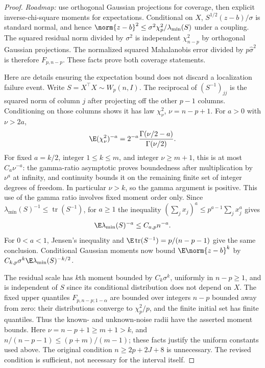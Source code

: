\begin{proof}
\emph{Roadmap:} use orthogonal Gaussian projections for coverage, then explicit inverse-chi-square moments for expectations. Conditional on $X$, $S^{1/2}(z-b)/\sigma$ is standard normal, and hence $\norm{z-b}^2\le\sigma^2\chi_p^2/\lambda_{\min}(S)$ under a coupling. The squared residual norm divided by $\sigma^2$ is independent $\chi^2_{n-p}$ by orthogonal Gaussian projections. The normalized squared Mahalanobis error divided by $p\widehat\sigma^2$ is therefore $F_{p,n-p}$. These facts prove both coverage statements.

Here are details ensuring the expectation bound does not discard a localization failure event. Write $S=X^\top X\sim W_p(n,I)$. The reciprocal of $(S^{-1})_{jj}$ is the squared norm of column $j$ after projecting off the other $p-1$ columns. Conditioning on those columns shows it has law $\chi^2_{\nu}$, $\nu=n-p+1$. For $a>0$ with $\nu>2a$,
\[
 \E(\chi_\nu^2)^{-a}=2^{-a}\frac{\Gamma(\nu/2-a)}{\Gamma(\nu/2)}.
\]
For fixed $a=k/2$, integer $1\le k\le m$, and integer $\nu\ge m+1$, this is at most $C_a\nu^{-a}$: the gamma-ratio asymptotic proves boundedness after multiplication by $\nu^a$ at infinity, and continuity bounds it on the remaining finite set of integer degrees of freedom. In particular $\nu>k$, so the gamma argument is positive. This use of the gamma ratio involves fixed moment order only. Since $\lambda_{\min}(S)^{-1}\le\operatorname{tr}(S^{-1})$, for $a\ge1$ the inequality $(\sum_jx_j)^a\le p^{a-1}\sum_jx_j^a$ gives
\[
 \E\lambda_{\min}(S)^{-a}\le C_{a,p}n^{-a}.
\]
For $0<a<1$, Jensen's inequality and $\E\operatorname{tr}(S^{-1})=p/(n-p-1)$ give the same conclusion. Conditional Gaussian moments now bound $\E\norm{z-b}^k$ by $C_{k,p}\sigma^k\E\lambda_{\min}(S)^{-k/2}$.

The residual scale has $k$th moment bounded by $C_k\sigma^k$, uniformly in $n-p\ge1$, and is independent of $S$ since its conditional distribution does not depend on $X$. The fixed upper quantiles $F_{p,n-p;1-\alpha}$ are bounded over integers $n-p$ bounded away from zero: their distributions converge to $\chi_p^2/p$, and the finite initial set has finite quantiles. Thus the known- and unknown-noise radii have the asserted moment bounds. Here $\nu=n-p+1\ge m+1>k$, and $n/(n-p-1)\le(p+m)/(m-1)$; these facts justify the uniform constants used above. The original condition $n\ge2p+2J+8$ is unnecessary. The revised condition is sufficient, not necessary for the interval itself.
\end{proof}

